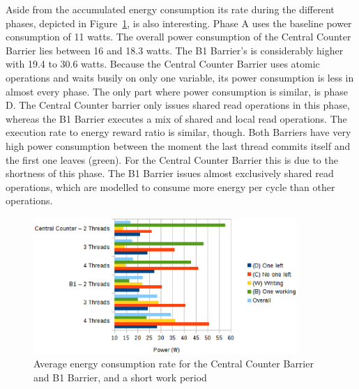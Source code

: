 \documentclass[a4paper, 10pt]{article}
\begin{document}
Aside from the accumulated energy consumption its rate during the different phases, depicted in Figure~\ref{fig:c1-power-work-100}, is also interesting.
Phase A uses the baseline power consumption of 11 watts.
The overall power consumption of the Central Counter Barrier lies between 16 and 18.3 watts. The B1 Barrier's is considerably higher with 19.4 to 30.6 watts.
Because the Central Counter Barrier uses atomic operations and waits busily on only one variable, its power consumption is less in almost every phase.
The only part where power consumption is similar, is phase D. The Central Counter barrier only issues shared read operations in this phase, whereas the B1 Barrier executes a mix of shared and local read operations. The execution rate to energy reward ratio is similar, though.
Both Barriers have very high power consumption between the moment the last thread commits itself and the first one leaves (green). For the Central Counter Barrier this is due to the shortness of this phase. The B1 Barrier issues almost exclusively shared read operations, which are modelled to consume more energy per cycle than other operations.
\begin{figure}[htbp]
	\centering
	\includegraphics[width=10cm]{charts/c1-power-work-100}
	\caption{Average energy consumption rate for the Central Counter Barrier and B1 Barrier, and a short work period}
	\label{fig:c1-power-work-100}
\end{figure}
\end{document}
